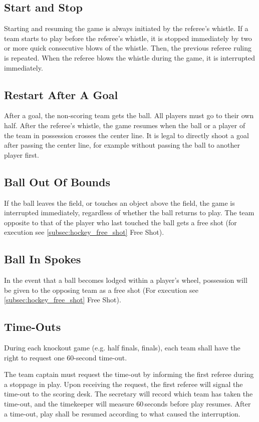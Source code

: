 \subsection{Start and Stop}
Starting and resuming the game is always initiated by the referee's whistle.
If a team starts to play before the referee's whistle, it is stopped immediately by two or more quick consecutive blows of the whistle.
Then, the previous referee ruling is repeated.
When the referee blows the whistle during the game, it is interrupted immediately.

\subsection{Restart After A Goal}
After a goal, the non-scoring team gets the ball.
All players must go to their own half.
After the referee's whistle, the game resumes when the ball or a player of the team in possession crosses the center line.
It is legal to directly shoot a goal after passing the center line, for example without passing the ball to another player first.

\subsection{Ball Out Of Bounds}
If the ball leaves the field, or touches an object above the field, the game is interrupted immediately, regardless of whether the ball returns to play.
The team opposite to that of the player who last touched the ball gets a free shot (for execution see \ref{subsec:hockey_free_shot} Free Shot).

\subsection{Ball In Spokes}
In the event that a ball becomes lodged within a player's wheel, possession will be given to the opposing team as a free shot (For execution see \ref{subsec:hockey_free_shot} Free Shot).

\subsection{Time-Outs}
During each knockout game (e.g. half finals, finals), each team shall have the right to request one 60-second time-out.

The team captain must request the time-out by informing the first referee during a stoppage in play.
Upon receiving the request, the first referee will signal the time-out to the scoring desk.
The secretary will record which team has taken the time-out, and the timekeeper will measure 60\,seconds before play resumes.
After a time-out, play shall be resumed according to what caused the interruption.

